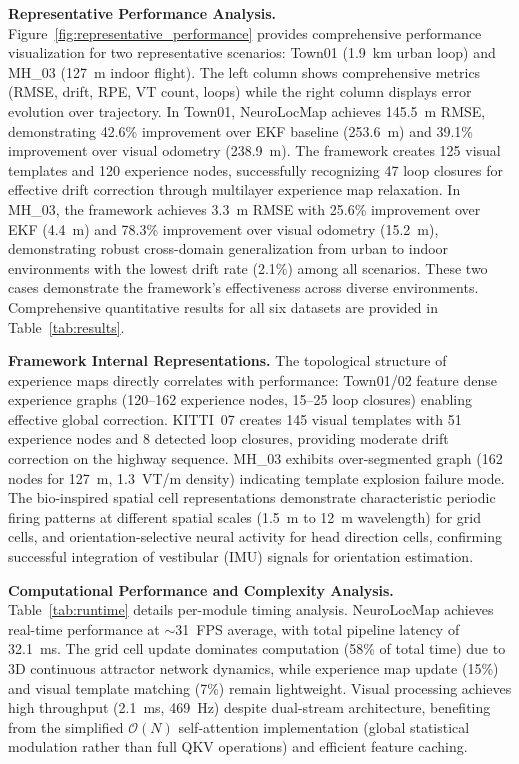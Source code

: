 \textbf{Representative Performance Analysis.} Figure~\ref{fig:representative_performance} provides comprehensive per\-for\-mance visualization for two representative scenarios: Town01 (1.9~km urban loop) and MH\_03 (127~m indoor flight). The left column shows comprehensive metrics (RMSE, drift, RPE, VT count, loops) while the right column displays error evolution over trajectory. In Town01, NeuroLocMap achieves 145.5~m RMSE, demonstrating 42.6\% improvement over EKF baseline (253.6~m) and 39.1\% improvement over visual odometry (238.9~m). The framework creates 125 visual templates and 120 experience nodes, successfully recognizing 47 loop closures for effective drift correction through multilayer experience map relaxation. In MH\_03, the framework achieves 3.3~m RMSE with 25.6\% improvement over EKF (4.4~m) and 78.3\% improvement over visual odometry (15.2~m), demonstrating robust cross-domain generalization from urban to indoor environments with the lowest drift rate (2.1\%) among all scenarios. These two cases demonstrate the framework's effectiveness across diverse environments. Comprehensive quantitative results for all six datasets are provided in Table~\ref{tab:results}.

\textbf{Framework Internal Representations.} The topological structure of experience maps directly correlates with per\-for\-mance: Town01/02 feature dense experience graphs (120--162 experience nodes, 15--25 loop closures) enabling effective global correction. KITTI~07 creates 145 visual templates with 51 experience nodes and 8 detected loop closures, providing moderate drift correction on the highway sequence. MH\_03 exhibits over-segmented graph (162 nodes for 127~m, 1.3~VT/m density) indicating template explosion failure mode. The bio-inspired spatial cell representations demonstrate characteristic periodic firing patterns at different spatial scales (1.5~m to 12~m wavelength) for grid cells, and orientation-selective neural activity for head direction cells, confirming successful integration of ves\-tib\-u\-lar (IMU) signals for orientation estimation.

\textbf{Computational Performance and Complexity Analysis.} Table~\ref{tab:runtime} details per-module timing analysis. NeuroLocMap achieves real-time per\-for\-mance at $\sim$31~FPS average, with total pipeline latency of 32.1~ms. The grid cell update dominates computation (58\% of total time) due to 3D continuous attractor network dynamics, while experience map update (15\%) and visual template matching (7\%) remain lightweight. Visual processing achieves high throughput (2.1~ms, 469~Hz) despite dual-stream architecture, benefiting from the simplified $\mathcal{O}(N)$ self-attention implementation (global statistical modulation rather than full QKV operations) and efficient feature caching.


